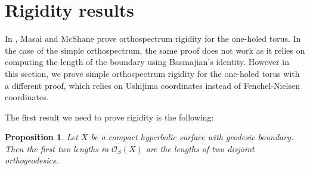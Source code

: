 \documentclass[a4paper,12pt]{article}
\newtheorem{proposition}[theorem]{Proposition}
\theoremstyle{definition}
\theoremstyle{remark}
\begin{document}
\section{Rigidity results}\label{sec:4}

In \cite{orthoSys}, Masai and McShane prove orthospectrum rigidity for the one-holed torus. In the case of the simple orthospectrum, the same proof does not work as it relies on computing the length of the boundary using Basmajian's identity. However in this section, we prove simple orthospectrum rigidity for the one-holed torus with a different proof, which relies on Ushijima coordinates instead of Fenchel-Nielsen coordinates. 

The first result we need to prove rigidity is the following:

\begin{proposition}\label{prop:DisjFirst}
    Let $X$ be a compact hyperbolic surface with geodesic boundary. Then the first two lengths in $\mathcal{O}_S(X)$ are the lengths of two disjoint orthogeodesics.
\end{proposition}
\end{document}
